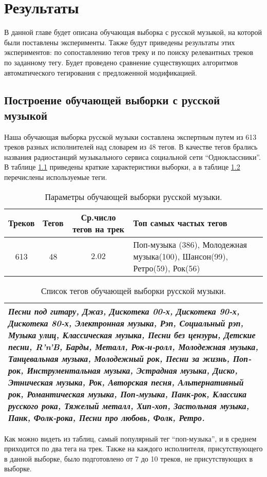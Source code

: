 \chapter{Результаты} 
\label{results}

В данной главе будет описана обучающая выборка с русской музыкой, на которой были поставлены эксперименты. 
Также будут приведены результаты этих экспериментов: по сопоставлению тегов треку 
и по поиску релевантных треков по заданному тегу. Будет проведено сравнение существующих алгоритмов
автоматического тегирования с предложенной модификацией.

\section{Построение обучающей выборки с русской музыкой}

Наша обучающая выборка русской музыки составлена экспертным путем из 613 треков разных исполнителей над словарем из 48 тегов. 
В качестве тегов брались названия радиостанций музыкального сервиса социальной сети ``Одноклассники''.
В таблице \ref{tab:rus_dataset} приведены краткие характеристики выборки, а в таблице \ref{tab:tags} перечислены используемые теги.
\begin{table}[ht]
\centering
\captionsetup{justification=centering}
\caption{Параметры обучающей выборки русской музыки.}
\label{tab:rus_dataset}
\begin{tabular}{ |c c c p{5cm}| }
  \hline    
  Треков & Тегов & Ср.число тегов на трек & Топ самых частых тегов \\  
  \hline    
  613 & 48 & $2.02$ & 
  Поп-музыка (386), Молодежная музыка(100), Шансон(99), Ретро(59), Рок(56) \\  
  \hline    
\end{tabular}
\end{table}

\begin{table}[ht]
\centering
\captionsetup{justification=centering}
\caption{Список тегов обучающей выборки русской музыки.}
\label{tab:tags}
\begin{tabular}{ |p{15cm}| }
  \hline    
  \emph{Песни под гитару, Джаз, Дискотека 00-х, Дискотека 90-х, Дискотека 80-х, Электронная музыка,
Рэп, Социальный рэп, Музыка улиц, Классическая музыка, Песни без цензуры, Детские песни, R'n'B, Барды, Металл, Рок-н-ролл,
Молодежная музыка, Танцевальная музыка, Молодежный рок, Песни за жизнь, Поп-рок, Инструментальная музыка, Эстрадная музыка,
Диско, Этническая музыка, Рок, Авторская песня, Альтернативный рок, Романтическая музыка, Поп-музыка, Панк-рок,
Классика русского рока, Тяжелый металл, Хип-хоп, Застольная музыка, Панк, Фолк-рока, Песни про любовь, Фолк, Ретро.}\\
\hline    
\end{tabular}
\end{table}
Как можно видеть из таблиц, самый популярный тег \ld ``поп-музыка'', и в среднем приходится по два тега на трек.
Также на каждого исполнителя, присутствующего в данной выборке, было подготовлено от 7 до 10 треков, не присутствующих в выборке.

